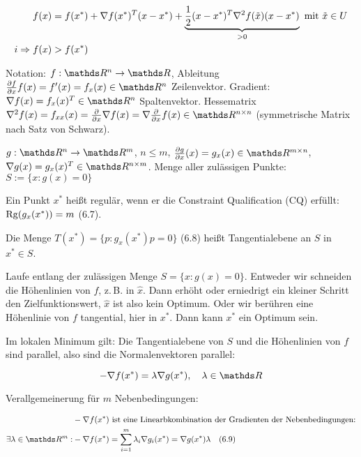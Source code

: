 \begin{align*}
f(x) &= f(x^*) + \nabla f(x^*)^T (x-x^*) + \underbrace{\frac 12 (x-x^*)^T \nabla^2 f(\tilde x) (x-x^*)}_{>0} \text{ mit } \tilde x \in U \\
i\Rightarrow f(x) &> f(x^*) \\
\end{align*}


Notation: $f: \R^n \to \R$, Ableitung $\frac{\partial f}{\partial x}f(x) = f'(x) = f_x(x) \in \R^n$ Zeilenvektor. Gradient: $\nabla f(x) = f_x(x)^T \in \R^n$ Spaltenvektor. Hessematrix $\nabla^2 f(x) = f_{xx}(x) = \frac{\partial}{\partial x} \nabla f(x) = \nabla \frac{\partial}{\partial x} f(x) \in \R^{n\times n}$ (symmetrische Matrix nach Satz von Schwarz).

$g: \R^n \to \R^m$, $n \leq m$, $\frac{\partial g}{\partial x} (x) = g_x(x) \in \R^{m\times n}$, $\nabla g(x) = g_x(x)^T \in \R^{n\times m}$. Menge aller zulässigen Punkte: $S := \{x : g(x) = 0\}$


Ein Punkt $x^*$ heißt regulär, wenn er die Constraint Qualification (CQ) erfüllt: $\mathrm{Rg}(g_x(x^*)) = m$ (6.7).


Die Menge $T(x^*) = \{ p : g_x(x^*) p = 0 \}$ (6.8) heißt Tangentialebene an $S$ in $x^* \in S$.

Laufe entlang der zulässigen Menge $S=\{x:g(x)=0\}$. Entweder wir schneiden die Höhenlinien von $f$, z.\,B. in $\hat x$. Dann erhöht oder erniedrigt ein kleiner Schritt den Zielfunktionswert, $\hat x$ ist also kein Optimum. Oder wir berühren eine Höhenlinie von $f$ tangential, hier in $x^*$. Dann kann $x^*$ ein Optimum sein.

Im lokalen Minimum gilt: Die Tangentialebene von $S$ und die Höhenlinien von $f$ sind parallel, also sind die Normalenvektoren parallel:

\[ -\nabla f(x^*) = \lambda \nabla g(x^*), \quad \lambda \in \R \]

Verallgemeinerung für $m$ Nebenbedingungen:

\begin{align*}
&-\nabla f(x^*) \text{ ist eine Linearbkombination der Gradienten der Nebenbedingungen:} \\
\exists \lambda \in \R^m : &-\nabla f(x^*) = \sum\limits_{i=1}^m \lambda_i \nabla g_i(x^*) = \nabla g(x^*) \lambda \quad (6.9) \\
\end{align*}

